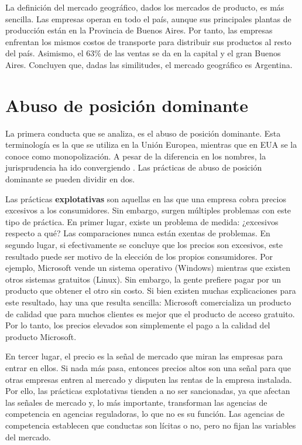 \documentclass[
  12pt,
  spanish,
]{book}
\begin{document}
La definición del mercado geográfico, dados los mercados de producto, es más sencilla. Las empresas operan en todo el país, aunque sus principales plantas de producción están en la Provincia de Buenos Aires. Por tanto, las empresas enfrentan los mismos costos de transporte para distribuir sus productos al resto del país. Asimismo, el 63\% de las ventas se da en la capital y el gran Buenos Aires. Concluyen que, dadas las similitudes, el mercado geográfico es Argentina.

\hypertarget{abuso-de-posiciuxf3n-dominante}{%
\section{Abuso de posición dominante}\label{abuso-de-posiciuxf3n-dominante}}

La primera conducta que se analiza, es el abuso de posición dominante. Esta terminología es la que se utiliza en la Unión Europea, mientras que en EUA se la conoce como monopolización. A pesar de la diferencia en los nombres, la jurisprudencia ha ido convergiendo \citep[sección 1.2]{Motta2004}. Las prácticas de abuso de posición dominante se pueden dividir en dos.

Las prácticas \textbf{explotativas} son aquellas en las que una empresa cobra precios excesivos a los consumidores. Sin embargo, surgen múltiples problemas con este tipo de práctica. En primer lugar, existe un problema de medida: ¿excesivos respecto a qué? Las comparaciones nunca están exentas de problemas. En segundo lugar, si efectivamente se concluye que los precios son excesivos, este resultado puede ser motivo de la elección de los propios consumidores. Por ejemplo, Microsoft vende un sistema operativo (Windows) mientras que existen otros sistemas gratuitos (Linux). Sin embargo, la gente prefiere pagar por un producto que obtener el otro sin costo. Si bien existen muchas explicaciones para este resultado, hay una que resulta sencilla: Microsoft comercializa un producto de calidad que para muchos clientes es mejor que el producto de acceso gratuito. Por lo tanto, los precios elevados son simplemente el pago a la calidad del producto Microsoft.

En tercer lugar, el precio es la señal de mercado que miran las empresas para entrar en ellos. Si nada más pasa, entonces precios altos son una señal para que otras empresas entren al mercado y disputen las rentas de la empresa instalada. Por ello, las prácticas explotativas tienden a no ser sancionadas, ya que afectan las señales de mercado y, lo más importante, transforman las agencias de competencia en agencias reguladoras, lo que no es su función. Las agencias de competencia establecen que conductas son lícitas o no, pero no fijan las variables del mercado.
\end{document}

